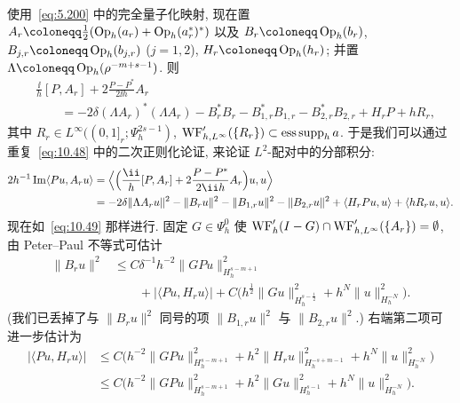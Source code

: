 使用~\eqref{eq:5.200} 中的完全量子化映射, 现在置 $A_r \defeq \frac{1}{2}(\operatorname{Op}_h(a_r) + \operatorname{Op}_h(a_r^*)^*)$ 以及 $B_r \defeq \operatorname{Op}_h(b_r)$, $B_{j,r} \defeq \operatorname{Op}_h(b_{j,r})$ ($j = 1, 2$), $H_r \defeq \operatorname{Op}_h(h_r)$; 并置 $\Lambda \defeq \operatorname{Op}_h(\rho^{-m+s-1})$. 则
\begin{equation}\label{eq:10.70}
    \begin{aligned}
        &\frac{\ii}{h}[P, A_r] + 2\frac{P - P^*}{2\ii h}A_r \\
        &\qquad = -2\delta(\Lambda A_r)^*(\Lambda A_r) - B_r^* B_r - B_{1,r}^* B_{1,r} - B_{2,r}^* B_{2,r} + H_r P + h R_r,
    \end{aligned}
\end{equation}
其中 $R_r \in L^\infty((0,1]_r; \Psi_h^{2s-1})$, $\operatorname{WF}_{h,L^\infty}'(\{R_r\}) \subset \operatorname{ess\,supp}_h a$. 于是我们可以通过重复~\eqref{eq:10.48} 中的二次正则化论证, 来论证 $L^2$-配对中的分部积分:
\begin{equation}\label{eq:10.71}
    \begin{aligned}
        2h^{-1}\operatorname{Im}\langle P u, A_r u \rangle
        &= \Bigl\langle \Bigl(\frac{\ii}{h}[P, A_r] + 2\frac{P - P^*}{2\ii h}A_r\Bigr)u, u \Bigr\rangle \\
        &= -2\delta\|\Lambda A_r u\|^2 - \|B_r u\|^2 - \|B_{1,r}u\|^2 - \|B_{2,r}u\|^2 + \langle H_r P u, u \rangle + \langle h R_r u, u \rangle.
    \end{aligned}
\end{equation}
现在如~\eqref{eq:10.49} 那样进行. 固定 $G \in \Psi_h^0$ 使 $\operatorname{WF}_h'(I - G) \cap \operatorname{WF}_{h,L^\infty}'(\{A_r\}) = \emptyset$, 由 Peter--Paul 不等式可估计
\begin{equation}\label{eq:10.72}
    \begin{aligned}
        \|B_r u\|^2 &\le C\delta^{-1}h^{-2}\|G P u\|_{H_h^{s-m+1}}^2 \\
        &\qquad + |\langle P u, H_r u \rangle| + C\bigl(h^{\frac{1}{2}}\|G u\|_{H_h^{s-\frac{1}{2}}}^2 + h^N\|u\|_{H_h^{-N}}^2\bigr).
    \end{aligned}
\end{equation}
(我们已丢掉了与 $\|B_r u\|^2$ 同号的项 $\|B_{1,r}u\|^2$ 与 $\|B_{2,r}u\|^2$.) 右端第二项可进一步估计为
\begin{equation}\label{eq:10.73}
    \begin{aligned}
        |\langle P u, H_r u \rangle| &\le C\bigl(h^{-2}\|G P u\|_{H_h^{s-m+1}}^2 + h^2\|H_r u\|_{H_h^{-s+m-1}}^2 + h^N\|u\|_{H_h^{-N}}^2\bigr) \\
        &\le C\bigl(h^{-2}\|G P u\|_{H_h^{s-m+1}}^2 + h^2\|G u\|_{H_h^{s-1}}^2 + h^N\|u\|_{H_h^{-N}}^2\bigr).
    \end{aligned}
\end{equation}
